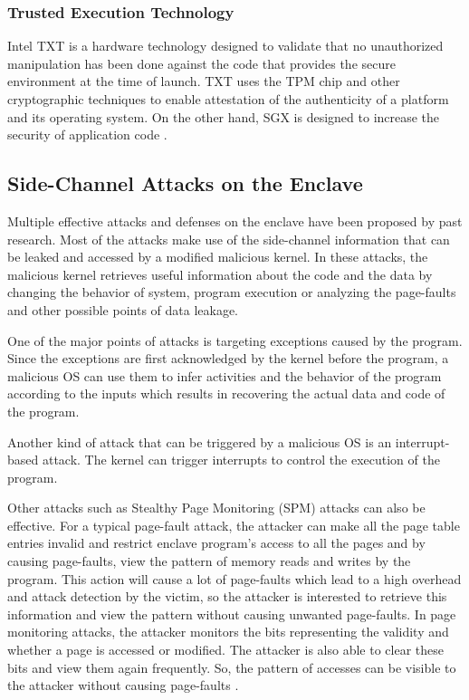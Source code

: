 \subsubsection{Trusted Execution Technology}
Intel TXT is a hardware technology designed to validate that no unauthorized manipulation has been done against the code that provides the secure environment at the time of launch. TXT uses the TPM chip and other cryptographic techniques to enable attestation of the authenticity of a platform and its operating system. On the other hand, SGX is designed to increase the security of application code \cite{txt}.

\subsection{Side-Channel Attacks on the Enclave}

Multiple effective attacks and defenses on the enclave have been proposed by past research. Most of the attacks make use of the side-channel information that can be leaked and accessed by a modified malicious kernel. In these attacks, the malicious kernel retrieves useful information about the code and the data by changing the behavior of system, program execution or analyzing the page-faults and other possible points of data leakage.

One of the major points of attacks is targeting exceptions caused by the program. Since the exceptions are first acknowledged by the kernel before the program, a malicious OS can use them to infer activities and the behavior of the program according to the inputs which results in recovering the actual data and code of the program.

Another kind of attack that can be triggered by a malicious OS is an interrupt-based attack. The kernel can trigger interrupts to control the execution of the program.

Other attacks such as Stealthy Page Monitoring (SPM) attacks \cite{stealthy,leakycauldron} can also be effective. For a typical page-fault attack, the attacker can make all the page table entries invalid and restrict enclave program's access to all the pages and by causing page-faults, view the pattern of memory reads and writes by the program. This action will cause a lot of page-faults which lead to a high overhead and attack detection by the victim, so the attacker is interested to retrieve this information and view the pattern without causing unwanted page-faults. In page monitoring attacks, the attacker monitors the bits representing the validity and whether a page is accessed or modified. The attacker is also able to clear these bits and view them again frequently. So, the pattern of accesses can be visible to the attacker without causing page-faults \cite{stealthy,leakycauldron}.


